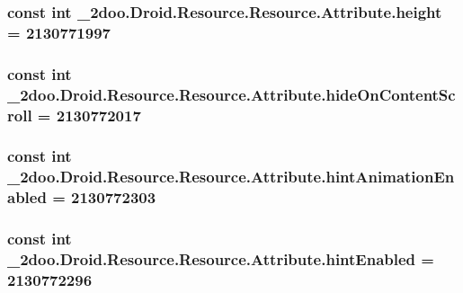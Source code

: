 \hypertarget{class__2doo_1_1_droid_1_1_resource_1_1_attribute_cd2b3868fb3ce3baad65f1752529b265}{
\subsubsection[{height}]{\setlength{\rightskip}{0pt plus 5cm}const int \_\-2doo.Droid.Resource.Resource.Attribute.height = 2130771997}}
\label{class__2doo_1_1_droid_1_1_resource_1_1_attribute_cd2b3868fb3ce3baad65f1752529b265}


\hypertarget{class__2doo_1_1_droid_1_1_resource_1_1_attribute_a030e4441db2b57773456f80877fe0a8}{
\subsubsection[{hideOnContentScroll}]{\setlength{\rightskip}{0pt plus 5cm}const int \_\-2doo.Droid.Resource.Resource.Attribute.hideOnContentScroll = 2130772017}}
\label{class__2doo_1_1_droid_1_1_resource_1_1_attribute_a030e4441db2b57773456f80877fe0a8}


\hypertarget{class__2doo_1_1_droid_1_1_resource_1_1_attribute_35725d8243f3ddfcec92e6f73c178949}{
\subsubsection[{hintAnimationEnabled}]{\setlength{\rightskip}{0pt plus 5cm}const int \_\-2doo.Droid.Resource.Resource.Attribute.hintAnimationEnabled = 2130772303}}
\label{class__2doo_1_1_droid_1_1_resource_1_1_attribute_35725d8243f3ddfcec92e6f73c178949}


\hypertarget{class__2doo_1_1_droid_1_1_resource_1_1_attribute_47f2aed3d3d35bdd330d91f01d5d84a4}{
\subsubsection[{hintEnabled}]{\setlength{\rightskip}{0pt plus 5cm}const int \_\-2doo.Droid.Resource.Resource.Attribute.hintEnabled = 2130772296}}
\label{class__2doo_1_1_droid_1_1_resource_1_1_attribute_47f2aed3d3d35bdd330d91f01d5d84a4}


